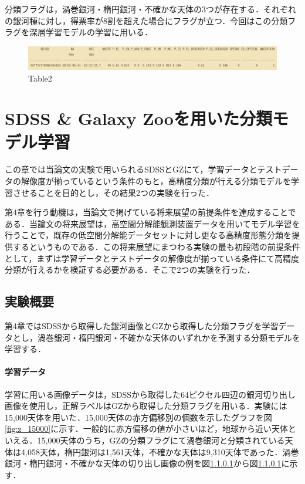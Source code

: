 \documentclass[a4j, 11pt]{jreport}
\begin{document}
分類フラグは，渦巻銀河・楕円銀河・不確かな天体の3つが存在する．それぞれの銀河種に対し，得票率が8割を超えた場合にフラグが立つ．今回はこの分類フラグを深層学習モデルの学習に用いる．

\begin{figure}[h]
 \centering
 \includegraphics[width=18cm]{images/table2.png}
 \caption{Table2}
 \label{fig:table2}
\end{figure}

\newpage
\chapter{SDSS \& Galaxy Zooを用いた分類モデル学習}
この章では当論文の実験で用いられるSDSSとGZにて，学習データとテストデータの解像度が揃っているという条件のもと，高精度分類が行える分類モデルを学習させることを目的とし，その結果2つの実験を行った．

第4章を行う動機は，当論文で掲げている将来展望の前提条件を達成することである．当論文の将来展望は，高空間分解能観測装置データを用いてモデル学習を行うことで，既存の低空間分解能データセットに対し更なる高精度形態分類を提供するというものである．この将来展望にまつわる実験の最も初段階の前提条件として，まずは学習データとテストデータの解像度が揃っている条件にて高精度分類が行えるかを検証する必要がある．そこで2つの実験を行った．

\section{実験概要}
第4章ではSDSSから取得した銀河画像とGZから取得した分類フラグを学習データとし，渦巻銀河・楕円銀河・不確かな天体のいずれかを予測する分類モデルを学習する．
\subsubsection{学習データ}
学習に用いる画像データは，SDSSから取得した64ピクセル四辺の銀河切り出し画像を使用し，正解ラベルはGZから取得した分類フラグを用いる．実験には15,000天体を用いた．15,000天体の赤方偏移別の個数を示したグラフを図\ref{fig:z_15000}に示す．一般的に赤方偏移の値が小さいほど，地球から近い天体といえる．15,000天体のうち，GZの分類フラグにて渦巻銀河と分類されている天体は4,058天体，楕円銀河は1,561天体，不確かな天体は9,310天体であった．渦巻銀河・楕円銀河・不確かな天体の切り出し画像の例を図\ref{}から図\ref{}に示す．
\end{document}
